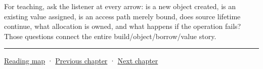 For teaching, ask the listener at every arrow: is a new object created, is an existing value assigned, is an access path merely bound, does source lifetime continue, what allocation is owned, and what happens if the operation fails? Those questions connect the entire build/object/borrow/value story.

\begin{center}\rule{0.5\linewidth}{0.5pt}\end{center}

\hyperref[volume-reading-map]{Reading map} · \hyperref[05-engine-i-ch002-how-bytes-become-programs-objects-and-resource-references]{Previous chapter} · \hyperref[05-engine-i-ch004-resource-ownership-failure-paths-and-review-practice]{Next chapter}
